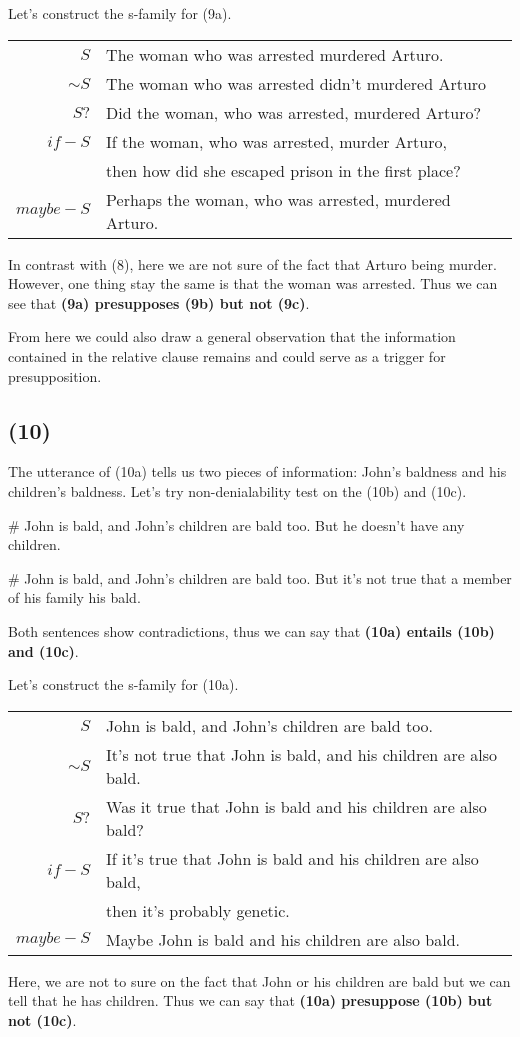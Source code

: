 \documentclass{article}
\begin{document}
Let's construct the s-family for (9a).
\begin{center}
\begin{tabular}{r|l}
    $S$ & The woman who was arrested murdered Arturo. \\
    $\sim S$ & The woman who was arrested didn't murdered Arturo \\
    $S?$ & Did the woman, who was arrested, murdered Arturo? \\
    $if-S$ & If the woman, who was arrested, murder Arturo, \\
    & then how did she escaped prison in the first place? \\
    $maybe-S$ & Perhaps the woman, who was arrested, murdered Arturo.\\
\end{tabular}
\end{center}
In contrast with (8), here we are not sure of the fact that Arturo being murder. However, one thing stay the same is that the woman was arrested. Thus we can see that \textbf{(9a) presupposes (9b) but not (9c)}. 

From here we could also draw a general observation that the information contained in the relative clause remains and could serve as a trigger for presupposition.

\subsection*{(10)} The utterance of (10a) tells us two pieces of information: John's baldness and his children's baldness. Let's try non-denialability test on the (10b) and (10c). 

\# John is bald, and John's children are bald too. But he doesn't have any children.

\# John is bald, and John's children are bald too. But it's not true that a member of his family his bald.

Both sentences show contradictions, thus we can say that \textbf{(10a) entails (10b) and (10c)}.

Let's construct the s-family for (10a).
\begin{center}
\begin{tabular}{r|l}
    $S$         & John is bald, and John's children are bald too.       \\
    $\sim S$    & It's not true that John is bald, and his children are also bald.    \\
    $S?$        & Was it true that John is bald and his children are also bald?     \\
    $if-S$      & If it's true that John is bald and his children are also bald,      \\
                & then it's probably genetic.     \\
    $maybe-S$   & Maybe John is bald and his children are also bald.\\
\end{tabular}
\end{center}
Here, we are not to sure on the fact that John or his children are bald but we can tell that he has children. Thus we can say that \textbf{(10a) presuppose (10b) but not (10c)}.
\end{document}

